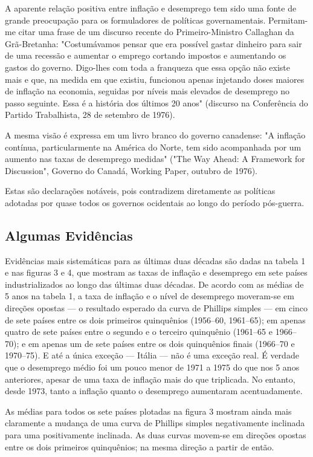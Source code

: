 \documentclass[12pt]{article}
\begin{document}
A aparente relação positiva entre inflação e desemprego tem sido uma fonte de grande preocupação para os formuladores de políticas governamentais. Permitam-me citar uma frase de um discurso recente do Primeiro-Ministro Callaghan da Grã-Bretanha: "Costumávamos pensar que era possível gastar dinheiro para sair de uma recessão e aumentar o emprego cortando impostos e aumentando os gastos do governo. Digo-lhes com toda a franqueza que essa opção não existe mais e que, na medida em que existiu, funcionou apenas injetando doses maiores de inflação na economia, seguidas por níveis mais elevados de desemprego no passo seguinte. Essa é a história dos últimos 20 anos" (discurso na Conferência do Partido Trabalhista, 28 de setembro de 1976).

A mesma visão é expressa em um livro branco do governo canadense: "A inflação contínua, particularmente na América do Norte, tem sido acompanhada por um aumento nas taxas de desemprego medidas" ("The Way Ahead: A Framework for Discussion", Governo do Canadá, Working Paper, outubro de 1976).

Estas são declarações notáveis, pois contradizem diretamente as políticas adotadas por quase todos os governos ocidentais ao longo do período pós-guerra.

\subsection{Algumas Evidências}

Evidências mais sistemáticas para as últimas duas décadas são dadas na tabela 1 e nas figuras 3 e 4, que mostram as taxas de inflação e desemprego em sete países industrializados ao longo das últimas duas décadas. De acordo com as médias de 5 anos na tabela 1, a taxa de inflação e o nível de desemprego moveram-se em direções opostas — o resultado esperado da curva de Phillips simples — em cinco de sete países entre os dois primeiros quinquênios (1956–60, 1961–65); em apenas quatro de sete países entre o segundo e o terceiro quinquênio (1961–65 e 1966–70); e em apenas um de sete países entre os dois quinquênios finais (1966–70 e 1970–75). E até a única exceção — Itália — não é uma exceção real. É verdade que o desemprego médio foi um pouco menor de 1971 a 1975 do que nos 5 anos anteriores, apesar de uma taxa de inflação mais do que triplicada. No entanto, desde 1973, tanto a inflação quanto o desemprego aumentaram acentuadamente.

As médias para todos os sete países plotadas na figura 3 mostram ainda mais claramente a mudança de uma curva de Phillips simples negativamente inclinada para uma positivamente inclinada. As duas curvas movem-se em direções opostas entre os dois primeiros quinquênios; na mesma direção a partir de então.
\end{document}
